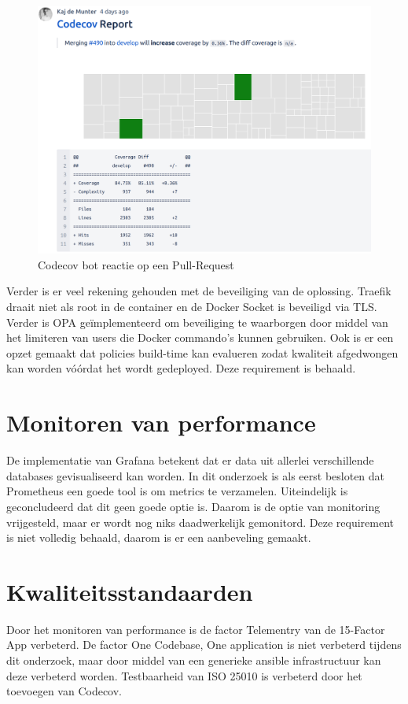 \begin{figure}[H]
	\centering
	\includegraphics[width=13cm]{Figures/coverage}
	\decoRule
	\caption[Codecov bot]{Codecov bot reactie op een Pull-Request}
	\label{fig:coverage}
\end{figure}

Verder is er veel rekening gehouden met de beveiliging van de oplossing. Traefik draait niet als root in de container en de Docker Socket is beveiligd via TLS. Verder is OPA geïmplementeerd om beveiliging te waarborgen door middel van het limiteren van users die Docker commando's kunnen gebruiken. Ook is er een opzet gemaakt dat policies build-time kan evalueren zodat kwaliteit afgedwongen kan worden vóórdat het wordt gedeployed. Deze requirement is behaald.

\section{Monitoren van performance}

De implementatie van Grafana betekent dat er data uit allerlei verschillende databases gevisualiseerd kan worden. In dit onderzoek is als eerst besloten dat Prometheus een goede tool is om metrics te verzamelen. Uiteindelijk is geconcludeerd dat dit geen goede optie is. Daarom is de optie van monitoring vrijgesteld, maar er wordt nog niks daadwerkelijk gemonitord. Deze requirement is niet volledig behaald, daarom is er een aanbeveling gemaakt.

\section{Kwaliteitsstandaarden}
Door het monitoren van performance is de factor Telementry van de 15-Factor App verbeterd. De factor One Codebase, One application is niet verbeterd tijdens dit onderzoek, maar door middel van een generieke ansible infrastructuur kan deze verbeterd worden. Testbaarheid van ISO 25010 is verbeterd door het toevoegen van Codecov. 

